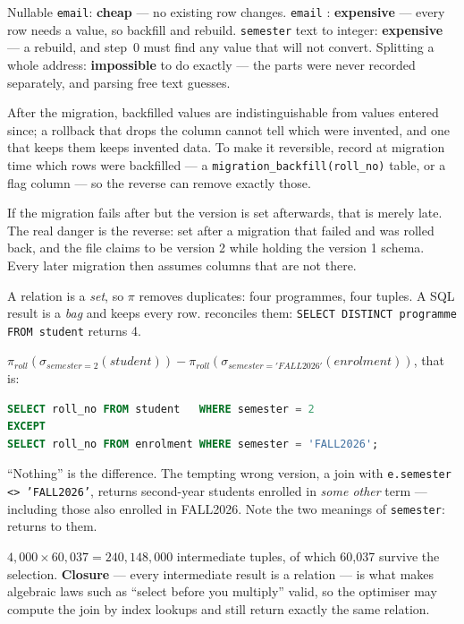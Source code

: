 \begin{ans}
  \item Nullable \texttt{email}: \textbf{cheap} --- no existing row changes.
        \texttt{email} : \textbf{expensive} --- every row needs
        a value, so backfill and rebuild. \texttt{semester} text to integer:
        \textbf{expensive} --- a rebuild, and step~0 must find any value that
        will not convert. Splitting a whole address: \textbf{impossible} to do
        exactly --- the parts were never recorded separately, and parsing free
        text guesses.
  \item After the migration, backfilled values are indistinguishable from
        values entered since; a rollback that drops the column cannot tell
        which were invented, and one that keeps them keeps invented data. To
        make it reversible, record at migration time which rows were
        backfilled --- a \texttt{migration\_backfill(roll\_no)} table, or a
        flag column --- so the reverse can remove exactly those.
  \item If the migration fails after  but the version is set
        afterwards, that is merely late. The real danger is the reverse: set
        after a migration that failed and was rolled back, and the file claims
        to be version 2 while holding the version 1 schema. Every later
        migration then assumes columns that are not there.
\end{ans}

\begin{ans}
  \item A relation is a \emph{set}, so $\pi$ removes duplicates: four
        programmes, four tuples. A SQL result is a \emph{bag} and keeps every
        row.  reconciles them:
        \texttt{SELECT DISTINCT programme FROM student} returns 4.
  \item $\pi_{roll}(\sigma_{semester=2}(\mathit{student})) -
        \pi_{roll}(\sigma_{semester='FALL2026'}(\mathit{enrolment}))$, that is:
\begin{lstlisting}[language=sql]
SELECT roll_no FROM student   WHERE semester = 2
EXCEPT
SELECT roll_no FROM enrolment WHERE semester = 'FALL2026';
\end{lstlisting}
        ``Nothing'' is the difference. The tempting wrong version, a join with
        \texttt{e.semester <> 'FALL2026'}, returns second-year students enrolled
        in \emph{some other} term --- including those also enrolled in
        FALL2026. Note the two meanings of \texttt{semester}: 
        returns to them.
  \item $4{,}000 \times 60{,}037 = 240{,}148{,}000$ intermediate tuples, of
        which 60{,}037 survive the selection. \textbf{Closure} --- every
        intermediate result is a relation --- is what makes algebraic laws such
        as ``select before you multiply'' valid, so the optimiser may compute
        the join by index lookups and still return exactly the same relation.
\end{ans}

